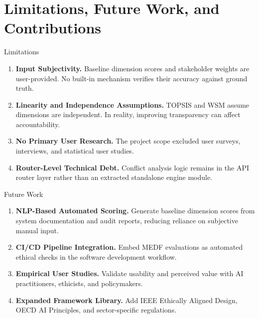 \section{Limitations, Future Work, and Contributions}

\begin{frame}{Limitations}
    \begin{enumerate}
        \item \textbf{Input Subjectivity.} Baseline dimension scores and stakeholder weights are user-provided. No built-in mechanism verifies their accuracy against ground truth.
        \item \textbf{Linearity and Independence Assumptions.} TOPSIS and WSM assume dimensions are independent. In reality, improving transparency can affect accountability.
        \item \textbf{No Primary User Research.} The project scope excluded user surveys, interviews, and statistical user studies.
        \item \textbf{Router-Level Technical Debt.} Conflict analysis logic remains in the API router layer rather than an extracted standalone engine module.
    \end{enumerate}
\end{frame}

\begin{frame}{Future Work}
    \begin{enumerate}
        \item \textbf{NLP-Based Automated Scoring.} Generate baseline dimension scores from system documentation and audit reports, reducing reliance on subjective manual input.
        \item \textbf{CI/CD Pipeline Integration.} Embed MEDF evaluations as automated ethical checks in the software development workflow.
        \item \textbf{Empirical User Studies.} Validate usability and perceived value with AI practitioners, ethicists, and policymakers.
        \item \textbf{Expanded Framework Library.} Add IEEE Ethically Aligned Design, OECD AI Principles, and sector-specific regulations.
    \end{enumerate}
\end{frame}

